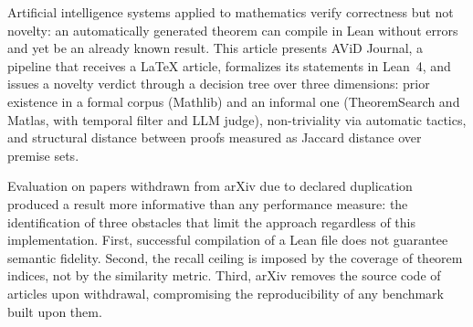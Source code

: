Artificial intelligence systems applied to mathematics verify correctness but not novelty: an automatically generated theorem can compile in Lean without errors and yet be an already known result. This article presents AViD Journal, a pipeline that receives a LaTeX article, formalizes its statements in Lean~4, and issues a novelty verdict through a decision tree over three dimensions: prior existence in a formal corpus (Mathlib) and an informal one (TheoremSearch and Matlas, with temporal filter and LLM judge), non-triviality via automatic tactics, and structural distance between proofs measured as Jaccard distance over premise sets.

Evaluation on papers withdrawn from arXiv due to declared duplication produced a result more informative than any performance measure: the identification of three obstacles that limit the approach regardless of this implementation. First, successful compilation of a Lean file does not guarantee semantic fidelity. Second, the recall ceiling is imposed by the coverage of theorem indices, not by the similarity metric. Third, arXiv removes the source code of articles upon withdrawal, compromising the reproducibility of any benchmark built upon them.